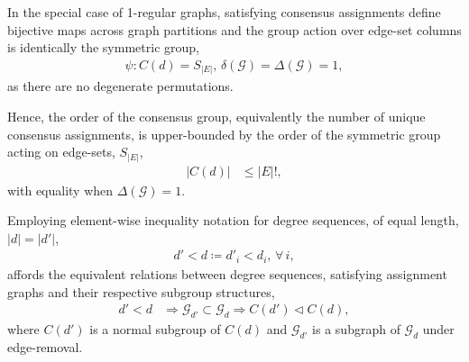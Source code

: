 In the special case of 1-regular graphs, satisfying consensus assignments define bijective maps across graph partitions and the group action over edge-set columns is identically the symmetric group,
\begin{align}
	\psi: C(d) = S_{|E|},\,\delta(\mathcal{G})=\Delta(\mathcal{G})=1,
\end{align}
as there are no degenerate permutations.

Hence, the order of the consensus group, equivalently the number of unique consensus assignments, is upper-bounded by the order of the symmetric group acting on edge-sets, $S_{|E|}$,
\begin{align} \label{eq:orbit_order}
	|C(d)| & \leq |E|!,
\end{align}
with equality when \mbox{$\Delta(\mathcal{G})=1$}.

Employing element-wise inequality notation for degree sequences, of equal length, \mbox{$|d|=|d'|$},
\begin{align}
	d' < d \coloneqq d'_i < d_i,\, \forall\, i,
\end{align}
affords the equivalent relations between degree sequences, satisfying assignment graphs and their respective subgroup structures,
\begin{align} \label{eq:sub_dgc}
	d' < d & \Rightarrow \mathcal{G}_{d'} \subset \mathcal{G}_d \Rightarrow C(d') \triangleleft C(d),
\end{align}
where $C(d')$ is a normal subgroup of $C(d)$ and $\mathcal{G}_{d'}$ is a subgraph of $\mathcal{G}_d$ under edge-removal.



